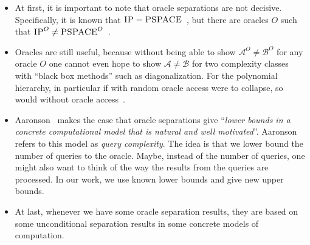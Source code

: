 \documentclass{article}
\begin{document}
    \begin{itemize}
        \item 
            At first, it is important to note that oracle separations are not decisive.
            Specifically, it is known that  $\textsc{IP} = \textsc{PSPACE}$~\cite{shamir1992ip}, but there are oracles \(O\) such that $\textsc{IP}^O \neq \textsc{PSPACE}^O$~\cite{chang1994random}.
        \item Oracles are still useful, because
        without being able to show \(\mathcal{A}^{O} \neq \mathcal{B}^{O}\) for any oracle \(O\) one cannot even hope to show \(\mathcal{A} \neq \mathcal{B}\) for two complexity classes with ``black box methods'' such as diagonalization.
        For the polynomial hierarchy, in particular if \PH with random oracle access were to collapse, so would \PH without oracle access~\cite{book1994collapsing}.
        
        \item Aaronson~\cite{Aaronson2010} makes the case that oracle separations give ``\textit{lower bounds in a concrete computational model that is natural and well motivated}''.
        Aaronson refers to this model as \textit{query complexity}. 
        The idea is that we lower bound the number of queries to the oracle.
        Maybe, instead of the number of queries, one might also want to think of the way the results from the queries are processed.
        In our work, we use known lower bounds and give new upper bounds.
        \item At last, 
        whenever we have some oracle separation results,
        they are based on some unconditional separation results in some concrete models of computation.

    \end{itemize}
    
\end{document}
